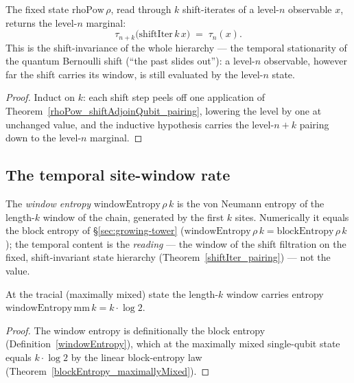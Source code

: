 \begin{theorem}\label{shiftIter_pairing}
  \leanok
  The fixed state \(\mathrm{rhoPow}\,\rho\), read through \(k\) shift-iterates of a level-\(n\)
  observable \(x\), returns the level-\(n\) marginal:
  \[
    \tau_{n+k}\bigl(\mathrm{shiftIter}\,k\,x\bigr) \;=\; \tau_n(x).
  \]
  This is the shift-invariance of the whole hierarchy --- the temporal stationarity of the quantum
  Bernoulli shift (``the past slides out''): a level-\(n\) observable, however far the shift carries
  its window, is still evaluated by the level-\(n\) state.
\end{theorem}
\begin{proof}\leanok
  Induct on \(k\): each shift step peels off one application of
  Theorem~\ref{rhoPow_shiftAdjoinQubit_pairing}, lowering the level by one at unchanged value, and the
  inductive hypothesis carries the level-\(n+k\) pairing down to the level-\(n\) marginal.
\end{proof}

\subsection{The temporal site-window rate}

\begin{definition}\label{windowEntropy}
  \leanok
  The \emph{window entropy} \(\mathrm{windowEntropy}\,\rho\,k\) is the von Neumann entropy of the
  length-\(k\) window of the chain, generated by the first \(k\) sites. Numerically it equals the
  block entropy of \S\ref{sec:growing-tower} (\(\mathrm{windowEntropy}\,\rho\,k=\mathrm{blockEntropy}\,
  \rho\,k\)); the temporal content is the \emph{reading} --- the window of the shift filtration on the
  fixed, shift-invariant state hierarchy (Theorem~\ref{shiftIter_pairing}) --- not the value.
\end{definition}

\begin{theorem}\label{windowEntropy_tracial}
  \leanok
  At the tracial (maximally mixed) state the length-\(k\) window carries entropy
  \(\mathrm{windowEntropy}\,\mathrm{mm}\,k = k\cdot\log 2\).
\end{theorem}
\begin{proof}\leanok
  The window entropy is definitionally the block entropy (Definition~\ref{windowEntropy}), which at the
  maximally mixed single-qubit state equals \(k\cdot\log 2\) by the linear block-entropy law
  (Theorem~\ref{blockEntropy_maximallyMixed}).
\end{proof}

